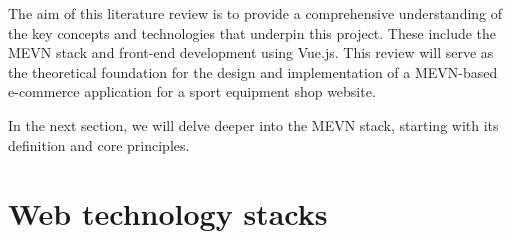 The aim of this literature review is to provide a comprehensive understanding of the key concepts and technologies that underpin this project. These include the MEVN stack and front-end development using Vue.js. This review will serve as the theoretical foundation for the design and implementation of a MEVN-based e-commerce application for a sport equipment shop website.

In the next section, we will delve deeper into the MEVN stack, starting with its definition and core principles.
\section{Web technology stacks}

